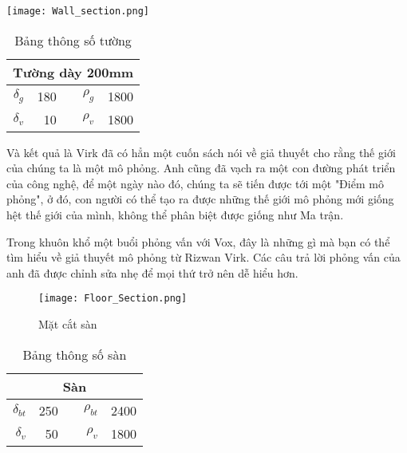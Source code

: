 




\begin{minipage}[H]{.5\linewidth}
	\centering
	\texttt{[image: Wall\_section.png]}
	\label{H:tstuong}
\end{minipage}
\begin{minipage}[H]{.5\linewidth}
	\begin{table}[H]
		\centering
		\begin{tabular}{|r|r|r|r|r|}
			\toprule
			\multicolumn{5}{|c|}{\textbf{Tường dày 200mm}} \\
			\midrule
			{\LARGE $\delta_{g}$} & 180   &       & {\LARGE $\rho_{g}$}  & 1800 \\
			\midrule
			{\LARGE $\delta_{v}$} & 10    &       & {\LARGE $\rho_{v}$}  & 1800 \\
			\bottomrule
		\end{tabular}%
		\caption{Bảng thông số tường}
		\label{B:tstuong}
	\end{table}
\end{minipage}

\vspace{0.5cm}
Và kết quả là Virk đã có hẳn một cuốn sách nói về giả thuyết cho rằng thế giới của chúng ta là một mô phỏng. Anh cũng đã vạch ra một con đường phát triển của công nghệ, để một ngày nào đó, chúng ta sẽ tiến được tới một "Điểm mô phỏng", ở đó, con người có thể tạo ra được những thế giới mô phỏng mới giống hệt thế giới của mình, không thể phân biệt được giống như Ma trận.

Trong khuôn khổ một buổi phỏng vấn với Vox, đây là những gì mà bạn có thể tìm hiểu về giả thuyết mô phỏng từ Rizwan Virk. Các câu trả lời phỏng vấn của anh đã được chỉnh sửa nhẹ để mọi thứ trở nên dễ hiểu hơn.



\begin{figure}[H]
		\centering
		\texttt{[image: Floor\_Section.png]}
		\caption{Mặt cắt sàn}
		\label{H:tssan}
\end{figure}

\begin{wraptable}{l}{0.35\textwidth}
		\centering
		\begin{tabular}{|r|r|r|r|r|}
			\toprule
			\multicolumn{5}{|c|}{\textbf{Sàn}} \\
			\midrule
			{\LARGE $\delta_{bt}$} & 250 &      & {\LARGE $\rho_{bt}$} & 2400 \\
			\midrule
			{\LARGE $\delta_{v}$} & 50   &      & {\LARGE $\rho_{v}$} & 1800 \\
			\bottomrule
		\end{tabular}%
		\caption{Bảng thông số sàn}
		\label{B:tssan}%
\end{wraptable}


